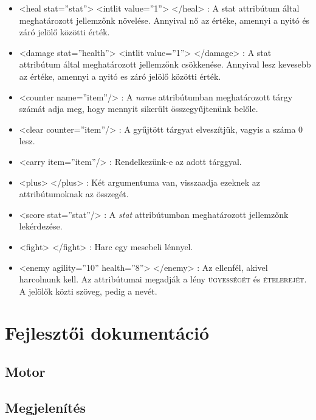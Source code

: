 \documentclass[12pt,a4paper,oneside]{report}
\newcommand{\stat}{\textsc}
\newcommand{\attr}{\emph}
\begin{document}
\begin{itemize}
      \item <{\color{Tag}heal}
        {\color{Attr}stat}={\color{Value}''stat}''> <{\color{Tag}intlit}
        {\color{Attr}value}={\color{Value}''1''}> <{\color{Tag}/heal}> :
        A stat attribútum által meghatározott jellemzőnk
        növelése. Annyival nő az értéke, amennyi a nyitó és záró
        jelölő közötti érték.
    
      \item <{\color{Tag}damage}
        {\color{Attr}stat}={\color{Value}''health''}>
        <{\color{Tag}intlit} {\color{Attr}value}={\color{Value}''1''}>
        <{\color{Tag}/damage}> : A stat attribútum által meghatározott
        jellemzőnk csökkenése. Annyival lesz kevesebb az értéke,
        amennyi a nyitó es záró jelölő közötti érték.
    
      \item <{\color{Tag}counter}
        {\color{Attr}name}={\color{Value}''item''}/> : A \attr{name}
        attribútumban meghatározott tárgy számát adja meg, hogy
        mennyit sikerült összegyűjtenünk belőle.

      \item <{\color{Tag}clear}
        {\color{Attr}counter}={\color{Value}''item''}/> : A gyűjtött
        tárgyat elveszítjük, vagyis a száma 0 lesz.
        
      \item <{\color{Tag}carry}
        {\color{Attr}item}={\color{Value}''item''}/> : Rendelkezünk-e az
        adott tárggyal.
    
      \item <{\color{Tag}plus}> <{\color{Tag}/plus}> : Két argumentuma
        van, visszaadja ezeknek az attribútumoknak az összegét.
    
      \item <{\color{Tag}score}
        {\color{Attr}stat}={\color{Value}''stat''}/> : A \attr{stat}
        attribútumban meghatározott jellemzőnk lekérdezése.
    
      \item <{\color{Tag}f{}ight}> <{\color{Tag}/f{}ight}> : Harc egy
        mesebeli lénnyel.
    
      \item <{\color{Tag}enemy}
        {\color{Attr}agility}={\color{Value}''10''}
        {\color{Attr}health}={\color{Value}''8''}> </enemy> : Az
        ellenfél, akivel harcolnunk kell. Az attribútumai megadják a
        lény \stat{ügyességét} és \stat{ételerejét}. A jelölők közti
        szöveg, pedig a nevét.
    \end{itemize}
  \section{Fejlesztői dokumentáció}
    \subsection{Motor}
    \subsection{Megjelenítés}
\end{document}
